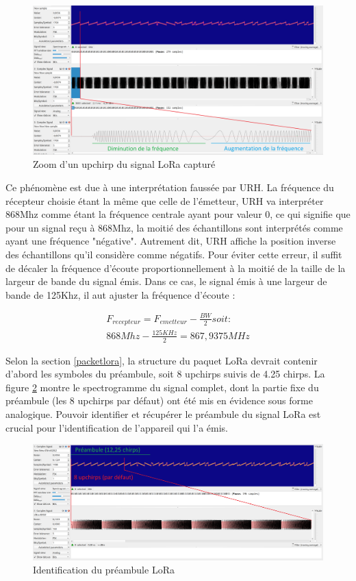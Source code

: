 \begin{figure}[h]
\centering

\includegraphics[scale=0.18]{images/urh5.png}
\caption{Zoom d'un upchirp du signal LoRa capturé}\label{term307}
\end{figure}

Ce phénomène est due à une interprétation faussée par URH. La fréquence du récepteur choisie étant la même que celle de l'émetteur, URH va interpréter 868Mhz comme étant la fréquence centrale ayant pour valeur 0, ce qui signifie que pour un signal reçu à 868Mhz, la moitié des échantillons sont interprétés comme ayant une fréquence "négative". Autrement dit, URH affiche la position inverse des échantillons qu'il considère comme négatifs. Pour éviter cette erreur, il suffit de décaler la fréquence d'écoute proportionnellement à la moitié de la taille de la largeur de bande du signal émis. Dans ce cas, le signal émis à une largeur de bande de 125Khz, il aut ajuster la fréquence d'écoute :

\begin{align}
    F_{recepteur} = F_{emetteur} - \frac{BW}{2} soit: \\
    868Mhz - \frac{125KHz}{2} = 867,9375MHz
\end{align}

Selon la section \ref{packetlora}, la structure du paquet LoRa devrait contenir d'abord les symboles du préambule, soit 8 upchirps suivis de 4.25 chirps. La figure \ref{term308} montre le spectrogramme du signal complet, dont la partie fixe du préambule (les 8 upchirps par défaut) ont été mis en évidence sous forme analogique. Pouvoir identifier et récupérer le préambule du signal LoRa est crucial pour l'identification de l'appareil qui l'a émis.


\begin{figure}[h]
\centering

\includegraphics[scale=0.18]{images/urh6.png}
\caption{Identification du préambule LoRa}\label{term308}
\end{figure}

